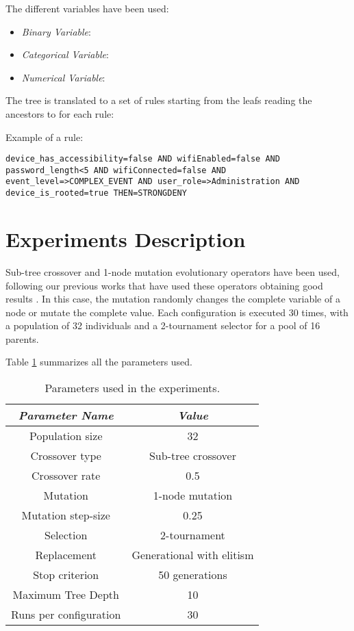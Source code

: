 \documentclass[runningheads,a4paper]{llncs}
\begin{document}
The different variables have been used:

\begin{itemize}
\item {\em Binary Variable}: %
\item {\em Categorical Variable}: 
\item {\em Numerical Variable}: 

\end{itemize}

The tree is translated to a set of rules starting from the leafs reading the ancestors to for each rule:

Example of a rule: %

\begin{verbatim}
device_has_accessibility=false AND wifiEnabled=false AND 
password_length<5 AND wifiConnected=false AND
event_level=>COMPLEX_EVENT AND user_role=>Administration AND
device_is_rooted=true THEN=STRONGDENY 
\end{verbatim}

\section{Experiments Description}
\label{sec:experiments}

Sub-tree crossover and 1-node mutation evolutionary operators have been used, following our previous works that have used these operators obtaining good results \cite{CITAR_AQUI_EVOSTAR14GPBOT}. In this case, the mutation randomly changes the complete variable of a node or mutate the complete value. Each configuration is executed 30 times, with a population of 32 individuals and a 2-tournament selector for a pool of 16 parents.


Table \ref{tab:parameters} summarizes all the parameters used.

\begin{table}
\begin{center}
\begin{tabular}{|c|c|}
\hline
{\em Parameter Name} & {\em Value} \\\hline
Population size & 32 \\\hline
Crossover type & Sub-tree crossover \\ \hline
Crossover rate & 0.5\\ \hline
Mutation  & 1-node mutation\\ \hline
Mutation step-size & 0.25 \\ \hline
Selection & 2-tournament \\ \hline
Replacement & Generational with elitism\\ \hline
Stop criterion & 50 generations \\ \hline
Maximum Tree Depth & 10 \\ \hline %
Runs per configuration & 30 \\ \hline
\end{tabular}
\caption{Parameters used in the experiments.}
\label{tab:parameters}
\end{center}
\end{table}
\end{document}
